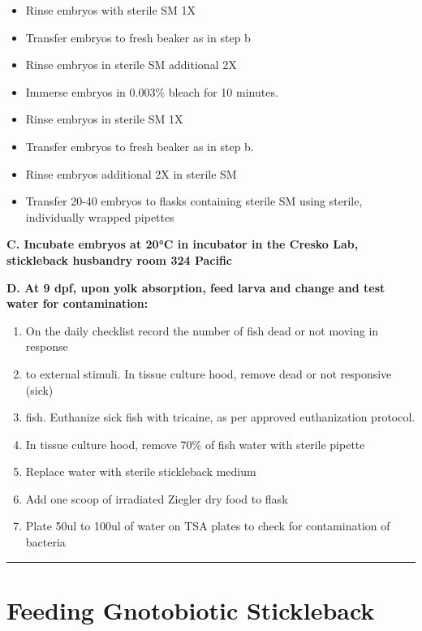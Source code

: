 \documentclass[
]{book}
\providecommand{\tightlist}{%
  \setlength{\itemsep}{0pt}\setlength{\parskip}{0pt}}
\begin{document}
\begin{itemize}
\item
  Rinse embryos with sterile SM 1X
\item
  Transfer embryos to fresh beaker as in step b
\item
  Rinse embryos in sterile SM additional 2X
\item
  Immerse embryos in 0.003\% bleach for 10 minutes.
\item
  Rinse embryos in sterile SM 1X
\item
  Transfer embryos to fresh beaker as in step b.
\item
  Rinse embryos additional 2X in sterile SM
\item
  Transfer 20-40 embryos to flasks containing sterile SM using sterile, individually wrapped pipettes
\end{itemize}

\textbf{C. Incubate embryos at 20°C in incubator in the Cresko Lab, stickleback husbandry room 324 Pacific}

\textbf{D. At 9 dpf, upon yolk absorption, feed larva and change and test water for contamination:}

\begin{enumerate}
\def\labelenumi{\arabic{enumi}.}
\tightlist
\item
  On the daily checklist record the number of fish dead or not moving in response\\
\item
  to external stimuli. In tissue culture hood, remove dead or not responsive (sick)\\
\item
  fish. Euthanize sick fish with tricaine, as per approved euthanization protocol.
\item
  In tissue culture hood, remove 70\% of fish water with sterile pipette
\item
  Replace water with sterile stickleback medium
\item
  Add one scoop of irradiated Ziegler dry food to flask
\item
  Plate 50ul to 100ul of water on TSA plates to check for contamination of bacteria
\end{enumerate}

\begin{center}\rule{0.5\linewidth}{0.5pt}\end{center}

\hypertarget{feeding-gnotobiotic-stickleback}{%
\section{Feeding Gnotobiotic Stickleback}\label{feeding-gnotobiotic-stickleback}}
\end{document}
